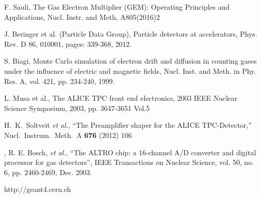 \documentclass[preprint,5p]{elsarticle}
\begin{document}
\begin{thebibliography}{99}
   F. Sauli, The Gas Electron Multiplier (GEM): Operating Principles and 
   Applications, Nucl. Instr. and Meth, A805(2016)2

   J. Beringer et al. (Particle Data Group), Particle detectors at 
   accelerators, Phys. Rev. D 86, 010001, pages: 339-368, 2012.

   S. Biagi, Monte Carlo simulation of electron drift and diffusion in counting 
   gases under the influence of electric and magnetic fields, Nucl.  Inst. and 
   Meth. in Phy. Res. A, vol. 421, pp. 234-240, 1999.

 L. Musa et al., The ALICE TPC front end electronics, 2003 IEEE Nuclear 
 Science Symposium, 2003, pp. 3647-3651 Vol.5
 
   H.~K.~Soltveit {\it et al.},
   ``The Preamplifier shaper for the ALICE TPC-Detector,''
   Nucl.\ Instrum.\ Meth.\ A {\bf 676} (2012) 106
 
 ,
 R. E. Bosch, {\it et al.}, ``The ALTRO chip: a 16-channel A/D converter and 
 digital processor for gas detectors'', IEEE Transactions on Nuclear Science, 
 vol. 50, no. 6, pp. 2460-2469, Dec. 2003.

http://geant4.cern.ch
 	

\end{thebibliography}
\end{document}

